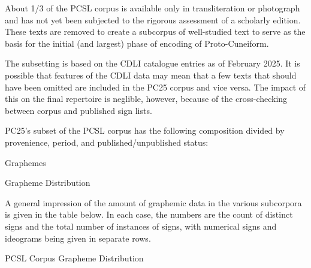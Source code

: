 \par About 1/3 of the PCSL corpus is available only in
      transliteration or photograph and has not yet been subjected to
      the rigorous assessment of a scholarly edition. These texts are
      removed to create a subcorpus of well-studied text to serve as
      the basis for the initial (and largest) phase of encoding of
      Proto-Cuneiform.


\par The subsetting is based on the CDLI catalogue entries as of
      February 2025.  It is possible that features of the CDLI data
      may mean that a few texts that should have been omitted are
      included in the PC25 corpus and vice versa. The impact of this
      on the final repertoire is neglible, however, because of the
      cross-checking between corpus and published sign lists.


\par PC25's subset of the PCSL corpus has the following
      composition divided by provenience, period, and
      published/unpublished status:

\bigskip
{}
\Hh{}Graphemes

\Hhhh{}Grapheme Distribution


\par A general impression of the amount of graphemic data in the
      various subcorpora is given in the table below.  In each case,
      the numbers are the count of distinct signs and the total number
      of instances of signs, with numerical signs and ideograms being
      given in separate rows.

\Hhhhh{}PCSL Corpus Grapheme Distribution

